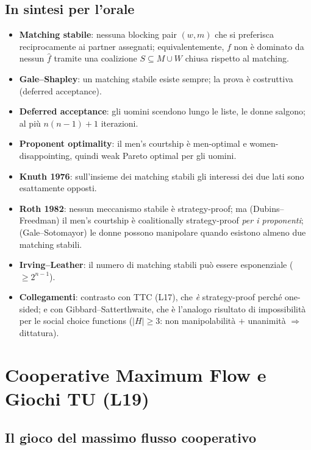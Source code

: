 \documentclass[12pt,a4paper,twoside]{book}
\theoremstyle{plain}
\theoremstyle{definition}
\begin{document}
\section*{In sintesi per l'orale}
\begin{itemize}
  \item \textbf{Matching stabile}: nessuna blocking pair $(w,m)$ che si preferisca reciprocamente ai partner assegnati; equivalentemente, $f$ non è dominato da nessun $\hat f$ tramite una coalizione $S\subseteq M\cup W$ chiusa rispetto al matching.
  \item \textbf{Gale--Shapley}: un matching stabile esiste sempre; la prova è costruttiva (deferred acceptance).
  \item \textbf{Deferred acceptance}: gli uomini scendono lungo le liste, le donne salgono; al più $n(n-1)+1$ iterazioni.
  \item \textbf{Proponent optimality}: il men's courtship è men-optimal e women-disappointing, quindi weak Pareto optimal per gli uomini.
  \item \textbf{Knuth 1976}: sull'insieme dei matching stabili gli interessi dei due lati sono esattamente opposti.
  \item \textbf{Roth 1982}: nessun meccanismo stabile è strategy-proof; ma (Dubins--Freedman) il men's courtship è coalitionally strategy-proof \emph{per i proponenti}; (Gale--Sotomayor) le donne possono manipolare quando esistono almeno due matching stabili.
  \item \textbf{Irving--Leather}: il numero di matching stabili può essere esponenziale ($\ge 2^{n-1}$).
  \item \textbf{Collegamenti}: contrasto con TTC (L17), che \emph{è} strategy-proof perché one-sided; e con Gibbard--Satterthwaite, che è l'analogo risultato di impossibilità per le social choice functions ($|H|\ge3$: non manipolabilità $+$ unanimità $\Rightarrow$ dittatura).
\end{itemize}

\chapter{Cooperative Maximum Flow e Giochi TU (L19)}
\label{ch:coop-flow}

\section{Il gioco del massimo flusso cooperativo}
\end{document}
